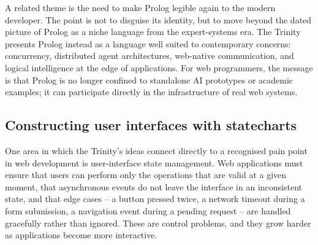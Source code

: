 A related theme is the need to make Prolog legible again to the modern developer. The point is not to disguise its identity, but to move beyond the dated picture of Prolog as a niche language from the expert-systems era. The Trinity presents Prolog instead as a language well suited to contemporary concerns: concurrency, distributed agent architectures, web-native communication, and logical intelligence at the edge of applications. For web programmers, the message is that Prolog is no longer confined to standalone AI prototypes or academic examples; it can participate directly in the infrastructure of real web systems.



\subsection*{Constructing user interfaces with statecharts}\label{sec:ui-statecharts}

One area in which the Trinity's ideas connect directly to a recognised pain point in web development is user-interface state management. Web applications must ensure that users can perform only the operations that are valid at a given moment, that asynchronous events do not leave the interface in an inconsistent state, and that edge cases -- a button pressed twice, a network timeout during a form submission, a navigation event during a pending request -- are handled gracefully rather than ignored. These are control problems, and they grow harder as applications become more interactive.

